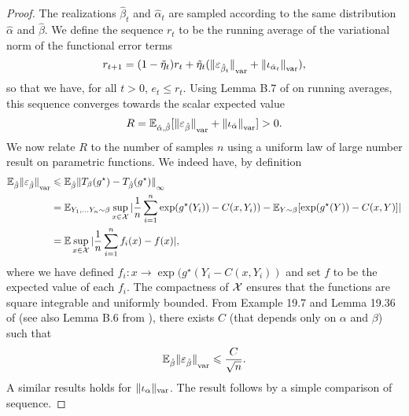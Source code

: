 \begin{proof}
The realizations $\hat \beta_t$ and $\hat \alpha_t$
are sampled according to the same distribution $\hat \alpha$ and $\hat \beta$. We
define the sequence $r_t$ to be the running average of the variational norm of the
functional error terms
\begin{equation}
    r_{t+1} = (1 - \tilde \eta_t) r_t + \tilde \eta_t 
    ({\Vert \varepsilon_{\hat \beta_t} \Vert}_{\text{\upshape var}} + 
    {\Vert \iota_{\hat \alpha_t} \Vert}_{\text{\upshape var}}),
\end{equation}
so that we have, for all $t > 0$, $e_t \leq r_t$.
Using Lemma B.7 of
\citet{mairal_stochastic_2013} on running averages, this sequence converges towards the scalar expected value
\begin{equation}
    R = \mathbb{E}_{\hat \alpha, \hat \beta}[{\Vert \varepsilon_{\hat \beta} \Vert}_{\text{\upshape var}}
    + {\Vert \iota_{\hat \alpha} \Vert}_{\text{\upshape var}}] > 0.
\end{equation}
We now relate $R$ to the number of samples $n$ using
a uniform law of large number result on parametric functions. We indeed have, by definition
\begin{align}\label{eq:vdv}
    \mathbb{E}_{\hat \beta} {\Vert \varepsilon_{\hat \beta} \Vert}_{\text{\upshape var}} 
    &\leqslant
    \mathbb{E}_{\hat \beta} {\Vert T_{\beta}(g^\star) 
    - T_{\hat \beta}(g^\star) \Vert}_{\infty} \\
    &= \mathbb{E}_{Y_1, \dots Y_n \sim \beta} 
    \sup_{x \in \mathcal{X}}
     | \frac{1}{n} \sum_{i=1}^n \exp(g^\star(Y_i)) - C(x, Y_i))
      - \mathbb{E}_{Y \sim \beta}[\exp(g^\star(Y)) - C(x, Y)] | \\
      &= \mathbb{E} \sup_{x \in \mathcal{X}} | \frac{1}{n} \sum_{i=1}^n f_i(x) - f(x) | ,
\end{align}
where we have defined $f_i: x \to \exp(g^\star(Y_i - C(x, Y_i))$ and set $f$ to be the
expected value of each $f_i$. The compactness of $\mathcal{X}$ ensures that the
functions  are square integrable and uniformly bounded. From Example 19.7 and
Lemma 19.36 of \citet{van_der_vaart_asymptotic_2000} (see also Lemma B.6 from
\citet{mairal_stochastic_2013}), there exists $C$ (that depends only on $\alpha$ and $\beta$) such that
\begin{equation}
    \mathbb{E}_{\hat \beta} {\Vert \varepsilon_{\hat \beta} \Vert}_{\text{\upshape var}}  \leqslant \frac{C}{\sqrt{n}}.
\end{equation}
A similar results holds for $\Vert \iota_\alpha \Vert_{\text{\upshape var}}$. The result follows by a simple comparison of sequence.
\end{proof}

